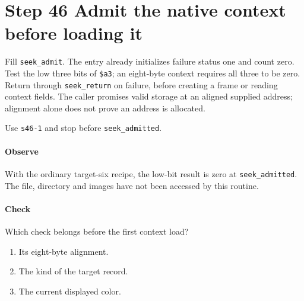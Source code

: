 \section{Step 46 Admit the native context before loading it}
Fill \texttt{seek\_admit}. The entry already initializes failure status one and count zero. Test the low three bits of \texttt{\$a3}; an eight-byte context requires all three to be zero. Return through \texttt{seek\_return} on failure, before creating a frame or reading context fields. The caller promises valid storage at an aligned supplied address; alignment alone does not prove an address is allocated.

Use \texttt{s46-1} and stop before \texttt{seek\_admitted}.

\paragraph{Observe} With the ordinary target-six recipe, the low-bit result is zero at \texttt{seek\_admitted}. The file, directory and images have not been accessed by this routine.

\paragraph{Check} Which check belongs before the first context load?
\begin{enumerate}[label=\Alph*.]
\item Its eight-byte alignment.
\item The kind of the target record.
\item The current displayed color.
\end{enumerate}
